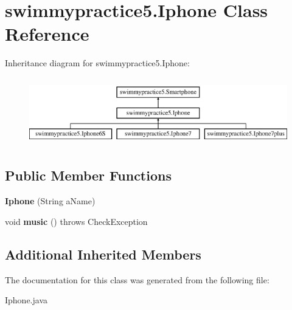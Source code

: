 \hypertarget{classswimmypractice5_1_1_iphone}{}\section{swimmypractice5.\+Iphone Class Reference}
\label{classswimmypractice5_1_1_iphone}
Inheritance diagram for swimmypractice5.\+Iphone\+:\begin{figure}[H]
\begin{center}
\leavevmode
\includegraphics[height=2.978723cm]{classswimmypractice5_1_1_iphone}
\end{center}
\end{figure}
\subsection*{Public Member Functions}
\begin{DoxyCompactItemize}
\item 
\mbox{\label{classswimmypractice5_1_1_iphone_acf7e3a44e1ae4bbe648b88fd9fde4766}} 
{\bfseries Iphone} (String a\+Name)
\item 
\mbox{\label{classswimmypractice5_1_1_iphone_a375d7b0bc7c61f14b6a692b0c760187d}} 
void {\bfseries music} ()  throws Check\+Exception 
\end{DoxyCompactItemize}
\subsection*{Additional Inherited Members}


The documentation for this class was generated from the following file\+:\begin{DoxyCompactItemize}
\item 
Iphone.\+java\end{DoxyCompactItemize}
